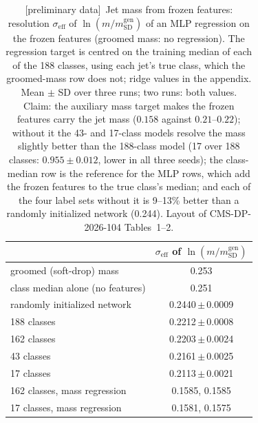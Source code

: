 \documentclass[11pt]{article}
\newcommand{\prelim}{\textcolor{red!70!black}{[preliminary data]}}
\newcommand{\pmm}{\,$\pm$\,}
\begin{document}
\begin{table}[p]
\centering
\small
\caption{\prelim\ Jet mass from frozen features: resolution $\sigma_{\mathrm{eff}}$ of
$\ln(m/m^{\mathrm{gen}}_{\mathrm{SD}})$ of an MLP regression on the frozen features (groomed mass:
no regression). The regression target is centred on the training median of each of the 188
classes, using each jet's true class, which the groomed-mass row does not; ridge values in the
appendix.
Mean $\pm$ SD over three runs; two runs: both values. Claim: the auxiliary mass target makes the
frozen features carry the jet mass ($0.158$ against $0.21$--$0.22$); without it the 43- and 17-class
models resolve the mass slightly better than the 188-class model (17 over 188 classes: $0.955\pm0.012$,
lower in all three seeds); the class-median row is the reference for the MLP rows, which add the frozen features to the true class's median; and each of the four label sets without it is 9--13\% better than a randomly
initialized network (0.244). Layout of CMS-DP-2026-104 Tables~1--2.}
\begin{tabular}{lc}
\toprule
 & $\sigma_{\mathrm{eff}}$ of $\ln(m/m^{\mathrm{gen}}_{\mathrm{SD}})$ \\
\midrule
groomed (soft-drop) mass & 0.253 \\
class median alone (no features) & 0.251 \\
randomly initialized network & 0.2440\pmm0.0009 \\
188 classes & 0.2212\pmm0.0008 \\
162 classes & 0.2203\pmm0.0024 \\
43 classes & 0.2161\pmm0.0025 \\
17 classes & 0.2113\pmm0.0021 \\
162 classes, mass regression & 0.1585, 0.1585 \\
17 classes, mass regression & 0.1581, 0.1575 \\
\bottomrule
\end{tabular}
\end{table}
\end{document}
